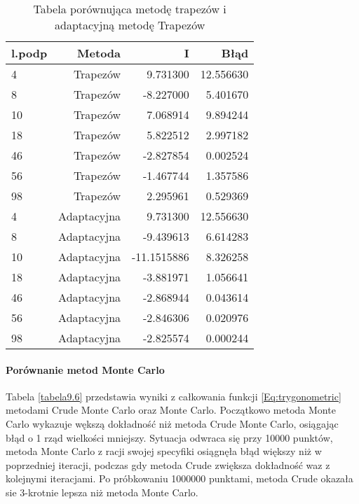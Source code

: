 \documentclass[12pt,twoside]{article}
\begin{document}
\begin{table}[H]
\centering 
\caption{Tabela porównująca metodę trapezów i adaptacyjną metodę Trapezów}
\label{tabela9.5}
\begin{tabular}{lrrr}
\toprule
{l.podp} & Metoda &  I &  Błąd \\
\midrule
4  &     Trapezów & 9.731300  &   12.556630 \\
8  &     Trapezów & -8.227000 &   5.401670 \\
10  &    Trapezów & 7.068914   &  9.894244  \\
18  &    Trapezów & 5.822512  &   2.997182  \\
46  &    Trapezów & -2.827854 &   0.002524   \\
56 &     Trapezów & -1.467744  &  1.357586  \\
98 &     Trapezów & 2.295961 &    0.529369  \\
\midrule
4  &     Adaptacyjna & 9.731300 &   12.556630 \\
8  &     Adaptacyjna & -9.439613 &   6.614283 \\
10  &    Adaptacyjna & -11.1515886  &   8.326258  \\
18  &    Adaptacyjna & -3.881971 &  1.056641  \\
46  &    Adaptacyjna & -2.868944 &   0.043614  \\
56 &     Adaptacyjna & -2.846306 &    0.020976  \\
98 &     Adaptacyjna & -2.825574 &    0.000244  \\

\bottomrule
\end{tabular}
\end{table}


\paragraph{Porównanie metod Monte Carlo}\mbox{}


Tabela \eqref{tabela9.6} przedstawia wyniki z całkowania funkcji \eqref{Eq:trygonometric} metodami Crude Monte Carlo oraz Monte Carlo. Początkowo metoda Monte Carlo wykazuje wększą dokładność niż metoda Crude Monte Carlo, osiągając błąd o 1 rząd wielkości mniejszy. Sytuacja odwraca się przy 10000 punktów, metoda Monte Carlo z racji swojej specyfiki osiągnęła błąd większy niż w poprzedniej iteracji, podczas gdy metoda Crude zwiększa dokładność waz z kolejnymi iteracjami. Po próbkowaniu 1000000 punktami, metoda Crude okazała sie 3-krotnie lepsza niż metoda Monte Carlo.
\end{document}
